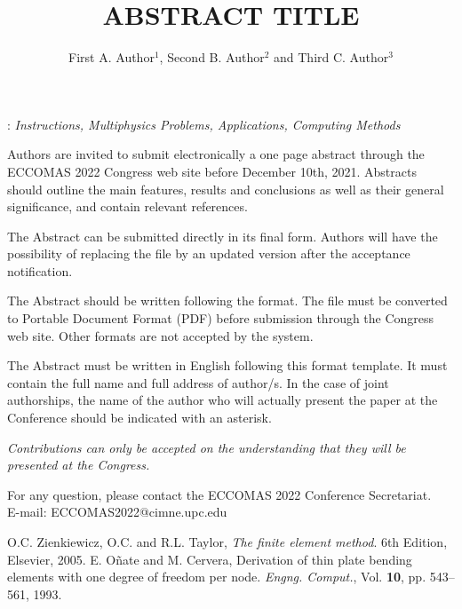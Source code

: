 \documentclass[12pt]{eccomas-2022-_abstract}
\title{ABSTRACT TITLE}
\author{First A. Author$^{1}$, Second B. Author$^{2}$ and Third C. Author$^{3}$}
\begin{document}
: {\it Instructions, Multiphysics Problems, Applications, Computing Methods}
\vskip0.5cm

Authors are invited to submit electronically a one page abstract through the ECCOMAS 2022 Congress web site before December 10th, 2021. Abstracts should outline the main features, results and conclusions as well as their general significance, and contain relevant references.

The Abstract can be submitted directly in its final form. Authors will have the possibility of replacing the file by an updated version after the acceptance notification.

The Abstract should be written following the format. The file must be converted to Portable Document Format (PDF) before submission through the Congress web site. Other formats are not accepted by the system.

The Abstract must be written in English following this format template. It must contain the full name and full address of author/s. In the case of joint authorships, the name of the author who will actually present the paper at the Conference should be indicated with an asterisk. 

\emph{Contributions can only be accepted on the understanding that they will be presented at the Congress.}

For any question, please contact the ECCOMAS 2022 Conference Secretariat.\\
E-mail: ECCOMAS2022@cimne.upc.edu 


\begin{thebibliography}{99}
  O.C. Zienkiewicz, O.C. and  R.L. Taylor,  \textit{The finite element method}. 6th Edition, Elsevier, 2005.
 E. O\~{n}ate and M. Cervera, Derivation of thin plate bending elements with one degree of freedom per node.
\textit{Engng. Comput.}, Vol. \textbf{10}, pp. 543--561, 1993.
\end{thebibliography}
\end{document}
